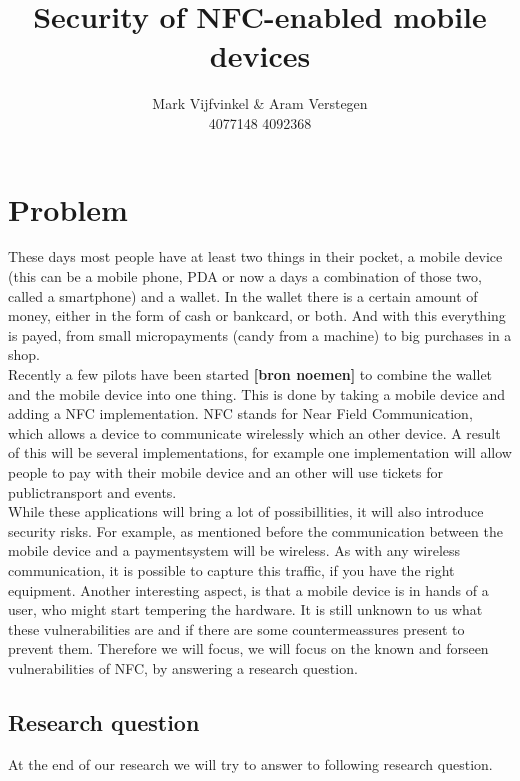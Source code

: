 \documentclass[11pt]{article} %
\title{Security of NFC-enabled mobile devices}
\author{Mark Vijfvinkel \& Aram Verstegen \\ 4077148 4092368}
\date{} %
\begin{document}
\maketitle


\section{Problem}

These days most people have at least two things in their pocket, a mobile device (this can be a mobile phone, PDA or now a days a combination of those two, called a smartphone) and a wallet. In the wallet there is a certain amount of money, either in the form of cash or bankcard, or both. And with this everything is payed, from small micropayments (candy from a machine) to big purchases in a shop.
\\ Recently a few pilots have been started \textbf { [bron noemen]} to combine the wallet and the mobile device into one thing. This is done by taking a mobile device and adding a NFC implementation. NFC stands for Near Field Communication, which allows a device to communicate wirelessly which an other device. A result of this will be several implementations, for example one implementation will allow people to pay with their mobile device and an other will use tickets for publictransport and events. 
\\ While these applications will bring a lot of possibillities, it will also introduce security risks. For example, as mentioned before the communication between the mobile device and a paymentsystem will be wireless. As with any wireless communication, it is possible to capture this traffic, if you have the right equipment. Another interesting aspect, is that a mobile device is in hands of a user, who might start tempering the hardware. It is still unknown to us what these vulnerabilities are and if there are some countermeassures present to prevent them. Therefore we will focus, we will focus on the known and forseen vulnerabilities of NFC, by answering a research question.

\subsection{Research question}

At the end of our research we will try to answer to following research question. 
\\
\end{document}
